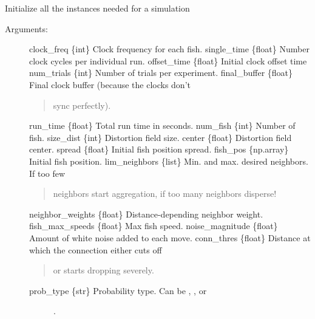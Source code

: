\documentclass[letterpaper,10pt,english]{sphinxmanual}
\begin{document}
\begin{fulllineitems}
\label{\detokenize{index:utils.init_simulation}}
Initialize all the instances needed for a simulation
\begin{description}
\item[{Arguments:}] \leavevmode
clock\_freq \{int\} \textendash{} Clock frequency for each fish.
single\_time \{float\} \textendash{} Number clock cycles per individual run.
offset\_time \{float\} \textendash{} Initial clock offset time
num\_trials \{int\} \textendash{} Number of trials per experiment.
final\_buffer \{float\} \textendash{} Final clock buffer (because the clocks don’t
\begin{quote}

sync perfectly).
\end{quote}

run\_time \{float\} \textendash{} Total run time in seconds.
num\_fish \{int\} \textendash{} Number of fish.
size\_dist \{int\} \textendash{} Distortion field size.
center \{float\} \textendash{} Distortion field center.
spread \{float\} \textendash{} Initial fish position spread.
fish\_pos \{np.array\} \textendash{} Initial fish position.
lim\_neighbors \{list\} \textendash{} Min. and max. desired neighbors. If too few
\begin{quote}

neighbors start aggregation, if too many neighbors disperse!
\end{quote}

neighbor\_weights \{float\} \textendash{} Distance-depending neighbor weight.
fish\_max\_speeds \{float\} \textendash{} Max fish speed.
noise\_magnitude \{float\} \textendash{} Amount of white noise added to each move.
conn\_thres \{float\} \textendash{} Distance at which the connection either cuts off
\begin{quote}

or starts dropping severely.
\end{quote}
\begin{description}
\item[{prob\_type \{str\} \textendash{} Probability type. Can be , , or}] \leavevmode
{}.


\end{description}
\end{description}
\end{fulllineitems}
\end{document}
